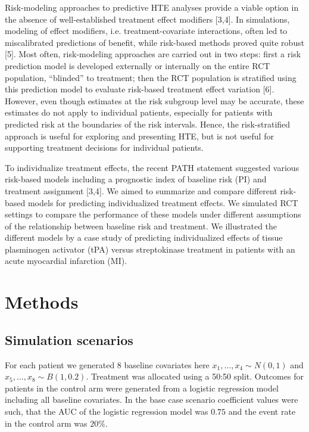 \documentclass{article}
\begin{document}
Risk-modeling approaches to predictive HTE analyses provide a viable
option in the absence of well-established treatment effect modifiers
{[}3,4{]}. In simulations, modeling of effect modifiers, i.e.
treatment-covariate interactions, often led to miscalibrated predictions
of benefit, while risk-based methods proved quite robust {[}5{]}. Most
often, risk-modeling approaches are carried out in two steps: first a
risk prediction model is developed externally or internally on the
entire RCT population, ``blinded'' to treatment; then the RCT population
is stratified using this prediction model to evaluate risk-based
treatment effect variation {[}6{]}. However, even though estimates at
the risk subgroup level may be accurate, these estimates do not apply to
individual patients, especially for patients with predicted risk at the
boundaries of the risk intervals. Hence, the risk-stratified approach is
useful for exploring and presenting HTE, but is not useful for
supporting treatment decisions for individual patients.

To individualize treatment effects, the recent PATH statement suggested
various risk-based models including a prognostic index of baseline risk
(PI) and treatment assignment {[}3,4{]}. We aimed to summarize and
compare different risk-based models for predicting individualized
treatment effects. We simulated RCT settings to compare the performance
of these models under different assumptions of the relationship between
baseline risk and treatment. We illustrated the different models by a
case study of predicting individualized effects of tissue plasminogen
activator (tPA) versus streptokinase treatment in patients with an acute
myocardial infarction (MI).

\hypertarget{methods}{%
\section{Methods}\label{methods}}

\hypertarget{simulation-scenarios}{%
\subsection{Simulation scenarios}\label{simulation-scenarios}}

For each patient we generated 8 baseline covariates here
\(x_1,\dots,x_4\sim N(0, 1)\) and \(x_5,\dots,x_8\sim B(1, 0.2)\).
Treatment was allocated using a 50:50 split. Outcomes for patients in
the control arm were generated from a logistic regression model
including all baseline covariates. In the base case scenario coefficient
values were such, that the AUC of the logistic regression model was
\(0.75\) and the event rate in the control arm was \(20\%\).
\end{document}
